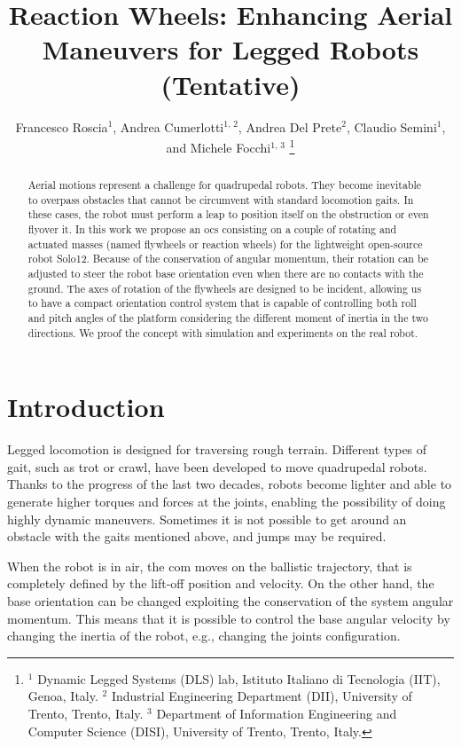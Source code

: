 \documentclass[journal,letterpaper]{IEEEtran}
\title{Reaction Wheels: Enhancing Aerial Maneuvers for
	Legged Robots (Tentative)}
\author{
	Francesco Roscia$^{1}$, Andrea Cumerlotti$^{1, \, 2}$, Andrea Del Prete$^{2}$, Claudio Semini$^{1}$, and Michele Focchi$^{1, \, 3}$
	\thanks{$^1$ Dynamic Legged Systems (DLS) lab, Istituto Italiano di Tecnologia (IIT), Genoa, Italy.
		$^2$ Industrial Engineering Department (DII), University of Trento, Trento, Italy.
		$^3$ Department of Information Engineering and Computer Science (DISI), University of Trento, Trento, Italy.
}}
\begin{document}
\maketitle
\thispagestyle{empty}
\pagestyle{empty}

\begin{abstract}%
Aerial motions represent a challenge for quadrupedal robots. They become inevitable to overpass obstacles that cannot be circumvent with standard locomotion gaits. In these cases, the robot must perform a leap to position itself on the obstruction or even flyover it. In this work we propose an \acrfull{ocs} consisting on a couple of rotating and actuated masses (named flywheels or reaction wheels) for the lightweight open-source robot Solo12. Because of the conservation of angular momentum, their rotation can be adjusted to steer the robot base orientation even when there are no contacts with the ground. The axes of rotation of the flywheels are designed to be incident, allowing us to have a compact orientation control system that is capable of controlling both roll and pitch angles of the platform considering the different moment of inertia in the two directions. We proof the concept with simulation and experiments on the real robot.
\end{abstract}

\begin{IEEEkeywords}
	 
\end{IEEEkeywords}

\section{Introduction}\label{sec:introduction}
Legged locomotion is designed for traversing rough terrain.
Different types of gait, such as trot or crawl, have been developed to move quadrupedal robots. 
Thanks to the progress of the last two decades, robots become lighter and able to generate higher torques and forces at the joints, enabling the possibility of doing highly dynamic maneuvers.
Sometimes it is not possible to get around an obstacle with the gaits mentioned above, and jumps may be required. 

When the robot is in air, the \acrfull{com} moves on the ballistic trajectory, that is completely defined by the lift-off position and velocity. On the other hand, the base orientation can be changed exploiting the conservation of the system angular momentum. This means that it is possible to control the base angular velocity by changing the inertia of the robot, e.g., changing the joints configuration. 
\end{document}
